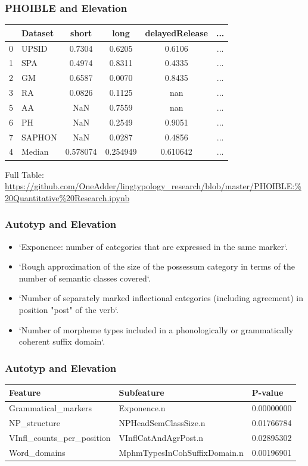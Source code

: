\documentclass{beamer}
\begin{document}
\begin{frame}
\frametitle{PHOIBLE and Elevation}
\begin{tabular}{llcccc}
\toprule
{} & Dataset &     short &      long & delayedRelease & ... \\
\midrule
0 &   UPSID &    0.7304 &    0.6205 &         0.6106 &    ... \\
1 &     SPA &    0.4974 &    0.8311 &         0.4335 &    ... \\
2 &      GM &    0.6587 &    0.0070 &         0.8435 &    ... \\
3 &      RA &    0.0826 &    0.1125 &            nan &    ... \\
5 &      AA &       NaN &    0.7559 &            nan &    ... \\
6 &      PH &       NaN &    0.2549 &         0.9051 &    ... \\
7 &  SAPHON &       NaN &    0.0287 &         0.4856 &    ... \\
\midrule
4 &  Median &  0.578074 &  0.254949 &       0.610642 &    ... \\
\bottomrule
\end{tabular}

Full Table: \url{https://github.com/OneAdder/lingtypology_research/blob/master/PHOIBLE:\%20Quantitative\%20Research.ipynb}
\end{frame}

\begin{frame}
\frametitle{Autotyp and Elevation}
\begin{itemize}
 \item `Exponence: number of categories that are expressed in the same marker`.
 \item `Rough approximation of the size of the possessum category in terms of the number of semantic classes covered`.
 \item `Number of separately marked inflectional categories (including agreement) in position "post" of the verb`.
 \item `Number of morpheme types included in a phonologically or grammatically coherent suffix domain`.
\end{itemize}
\end{frame}

\begin{frame}
\frametitle{Autotyp and Elevation}
\begin{adjustbox}{max width=\textwidth}
\begin{tabular}{lll}
\toprule
Feature &                    Subfeature &     P-value \\
\midrule
Grammatical\_markers &                   Exponence.n &  0.00000000 \\
NP\_structure &          NPHeadSemClassSize.n &  0.01766784 \\
VInfl\_counts\_per\_position &          VInflCatAndAgrPost.n &  0.02895302 \\
Word\_domains &  MphmTypesInCohSuffixDomain.n &  0.00196901 \\
\bottomrule
\end{tabular}
\end{adjustbox}
\end{frame}
\end{document}
